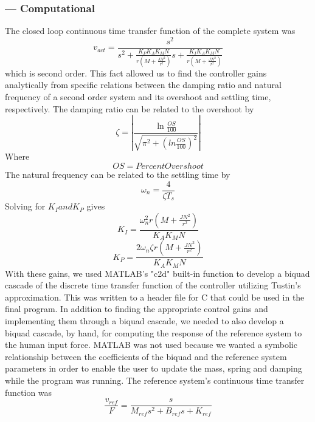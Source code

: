 \subsubsection*{ --- Computational}
The closed loop continuous time transfer function of the complete system was 
\begin{equation}
v_{act}=\frac{s^{2}}{s^{2}+\frac{K_{P}K_{A}K_{M}N}{r(M+\frac{JN^{2}}{r^{2}})}s+\frac{K_{I}K_{A}K_{M}N}{r(M+\frac{JN^{2}}{r^{2}})}}
\end{equation}
which is second order. This fact allowed us to find the controller gains analytically from specific relations between the damping ratio and natural frequency of a second order system and its overshoot and settling time, respectively. The damping ratio can be related to the overshoot by
\begin{equation}
\zeta=|\frac{\ln{\frac{OS}{100}}}{\sqrt{\pi^{2}+(ln{\frac{OS}{100}})^{2}}}|
\end{equation}
Where
\begin{equation}
OS=Percent Overshoot
\end{equation}
The natural frequency can be related to the settling time by
\begin{equation}
\omega_{n}=\frac{4}{\zeta T_{s}}
\end{equation}
Solving for $ K_{I} and K_{P} $ gives
\begin{equation}
K_{I}=\frac{\omega_{n}^{2}r(M+\frac{JN^{2}}{r^{2}})}{K_{A}K_{M}N}
\end{equation}
\begin{equation}
K_{P}=\frac{2\omega_{n}\zeta r(M+\frac{JN^{2}}{r^{2}})}{K_{A}K_{M}N}
\end{equation}
With these gains, we used MATLAB's "c2d" built-in function to develop a biquad cascade of the discrete time transfer function of the controller utilizing Tustin's approximation. This was written to a header file for C that could be used in the final program.
In addition to finding the appropriate control gains and implementing them through a biquad cascade, we needed to also develop a biquad cascade, by hand, for computing the response of the reference system to the human input force. MATLAB was not used because we wanted a symbolic relationship between the coefficients of the biquad and the reference system parameters in order to enable the user to update the mass, spring and damping while the program was running. The reference system's continuous time transfer function was
\begin{equation}
\frac{v_{ref}}{F}=\frac{s}{M_{ref}s^{2}+B_{ref}s+K_{ref}}
\end{equation}
